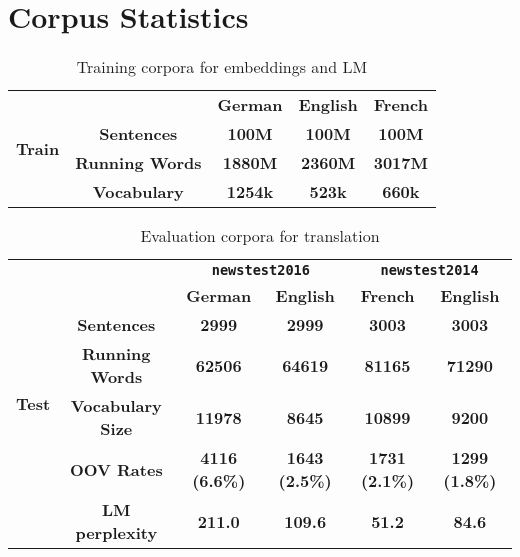 \section{Corpus Statistics}
\begin{table}[H]
	\centering
	\begin{tabular}{c|c|c|c|c}
		\hline
		\multirow{4}{*}{\textbf{Train}} & \textbf{}              & \textbf{German} & \textbf{English} & \textbf{French} \\ \cline{2-5} 
		& \textbf{Sentences}     & \textbf{100M}   & \textbf{100M}    & \textbf{100M}   \\ \cline{2-5} 
		& \textbf{Running Words} & \textbf{1880M}  & \textbf{2360M}   & \textbf{3017M}  \\ \cline{2-5} 
		& \textbf{Vocabulary}    & \textbf{1254k}  & \textbf{523k}    & \textbf{660k}   \\ \hline
	\end{tabular}
	\caption{Training corpora for embeddings and LM}
\end{table}

\begin{table}[H]
	\centering
	
	\begin{tabular}{c|c|c|c|c|c}
		\hline
		\multirow{7}{*}{\textbf{Test}} & \textbf{}                      & \multicolumn{2}{c|}{\textbf{\texttt{newstest2016}}}    & \multicolumn{2}{c}{\textbf{\texttt{newstest2014}}}    \\ \cline{3-6} 
		& \multicolumn{1}{l|}{\textbf{}} & \textbf{German}       & \textbf{English}      & \textbf{French}       & \textbf{English}      \\ \cline{2-6} 
		& \textbf{Sentences}             & \textbf{2999}         & \textbf{2999}         & \textbf{3003}         & \textbf{3003}         \\ \cline{2-6} 
		& \textbf{Running Words}         & \textbf{62506}        & \textbf{64619}        & \textbf{81165}        & \textbf{71290}        \\ \cline{2-6} 
		& \textbf{Vocabulary Size}       & \textbf{11978}        & \textbf{8645}         & \textbf{10899}        & \textbf{9200}         \\ \cline{2-6} 
		& \textbf{OOV Rates}             & \textbf{4116 (6.6\%)} & \textbf{1643 (2.5\%)} & \textbf{1731 (2.1\%)} & \textbf{1299 (1.8\%)} \\ \cline{2-6} 
		& \textbf{LM perplexity}         & \textbf{211.0}        & \textbf{109.6}        & \textbf{51.2}         & \textbf{84.6}         \\ \hline
		
	\end{tabular}
	\caption{Evaluation corpora for translation}
\end{table}
